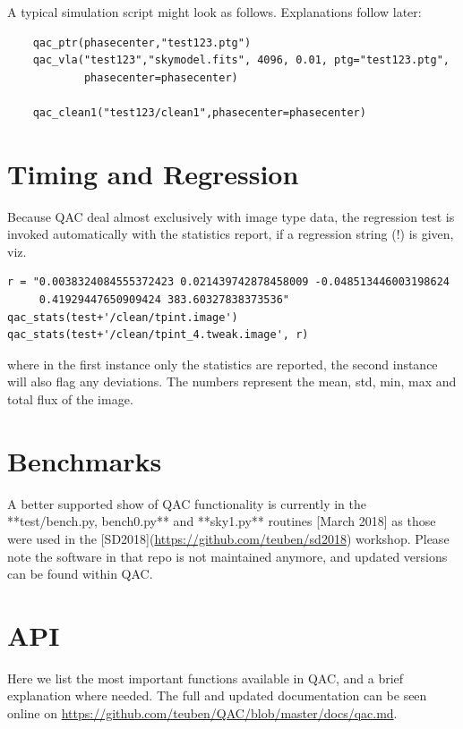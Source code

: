\documentclass[11pt,twoside]{article}
\begin{document}
A typical simulation script might look as follows. Explanations follow later:

\footnotesize
\begin{verbatim}
    qac_ptr(phasecenter,"test123.ptg")
    qac_vla("test123","skymodel.fits", 4096, 0.01, ptg="test123.ptg",
            phasecenter=phasecenter)
            
    qac_clean1("test123/clean1",phasecenter=phasecenter)
\end{verbatim}
\normalsize

\section{Timing and Regression}

Because QAC deal almost exclusively with image type data, the regression test is invoked automatically
with the statistics report, if a regression string (!) is given, viz.

\footnotesize
\begin{verbatim}
r = "0.0038324084555372423 0.021439742878458009 -0.048513446003198624
     0.41929447650909424 383.60327838373536"
qac_stats(test+'/clean/tpint.image')
qac_stats(test+'/clean/tpint_4.tweak.image', r)
\end{verbatim}
\normalsize

where in the first instance only the statistics are reported, the second instance will also flag any deviations.
The numbers represent the mean, std, min, max and total flux of the image.

\section{Benchmarks}

A better supported show of QAC functionality is currently in the **test/bench.py, bench0.py** and **sky1.py** routines [March 2018]
as those were used in the
[SD2018](\url{https://github.com/teuben/sd2018}) workshop. Please note the software in that repo is not maintained anymore,
and updated versions can be found
within QAC.

\section{API}

Here we list the most important functions available in QAC, and a brief explanation where needed. The full and updated
documentation can be seen online on \url{https://github.com/teuben/QAC/blob/master/docs/qac.md}.
\end{document}
